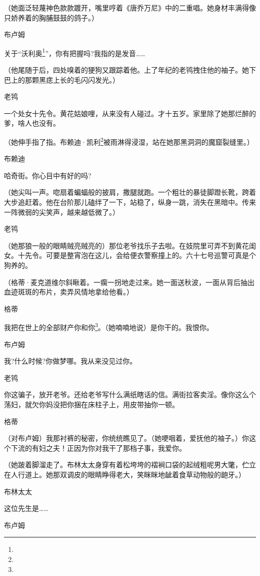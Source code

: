 \par （她面泛轻蔑神色款款踱开，嘴里哼着《唐乔万尼》中的二重唱。她身材丰满得像只娇养着的胸脯鼓鼓的鸽子。）
\par 布卢姆
\par 关于“沃利奥\footnote{}”，你有把握吗?我指的是发音……
\par （他尾随于后，四处嗅着的㹴狗又跟踪着他。上了年纪的老鸨拽住他的袖子。她下巴上的那颗黑痣上长的毛闪闪发光。）
\par 老鸨
\par 一个处女十先令。黄花姑娘哩，从来没有人碰过。才十五岁。家里除了她那烂醉的爹，啥人也没有。
\par （她伸手指了指。布赖迪·凯利\footnote{}被雨淋得浸湿，站在她那黑洞洞的魔窟裂缝里。）
\par 布赖迪
\par 哈奇街。你心目中有好的吗?
\par （她尖叫一声。唿扇着蝙蝠般的披肩，撒腿就跑。一个粗壮的暴徒脚蹬长靴，跨着大步追赶着。他在台阶那儿磕绊了一下，站稳了，纵身一跳，消失在黑暗中。传来一阵微弱的尖笑声，越来越低微了。）
\par 老鸨
\par （她那狼一般的眼睛贼亮贼亮的）那位老爷找乐子去啦。在妓院里可弄不到黄花闺女。十先令。可要是整宵泡在这儿，会给便衣警察撞上的。六十七号巡警可真是个狗养的。
\par （格蒂·麦克道维尔斜瞅着。一瘸一拐地走过来。她一面送秋波，一面从背后抽出血迹斑斑的布片，卖弄风情地拿给他看。）
\par 格蒂
\par 我把在世上的全部财产你和你\footnote{}。（她喃喃地说）是你干的。我恨你。
\par 布卢姆
\par 我?什么时候?你做梦哪。我从来没见过你。
\par 老鸨
\par 你这骗子，放开老爷。还给老爷写什么满纸瞎话的信。满街拉客卖淫。像你这么个荡妇，就欠你妈没把你捆在床柱子上，用皮带抽你一顿。
\par 格蒂
\par （对布卢姆）我那衬裤的秘密，你统统瞧见了。（她哽咽着，爱抚他的袖子。）你这个下流的有妇之夫！正因为你对我干了那档子事，我爱你。
\par （她跛着脚溜走了。布林太太身穿有着松垮垮的褶裥口袋的起绒粗呢男大氅，伫立在人行道上。她那双调皮的眼睛睁得老大，笑眯眯地龇着食草动物般的龅牙。）
\par 布林太太
\par 这位先生是……
\par 布卢姆
